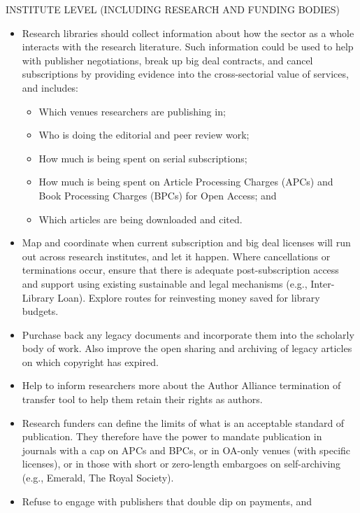 \documentclass[]{article}
\begin{document}
INSTITUTE LEVEL (INCLUDING RESEARCH AND FUNDING BODIES)

\begin{itemize}
\item
  Research libraries should collect information about how the sector as
  a whole interacts with the research literature. Such information could
  be used to help with publisher negotiations, break up big deal
  contracts, and cancel subscriptions by providing evidence into the
  cross-sectorial value of services, and includes:

  \begin{itemize}
  \item
    Which venues researchers are publishing in;
  \item
    Who is doing the editorial and peer review work;
  \item
    How much is being spent on serial subscriptions;
  \item
    How much is being spent on Article Processing Charges (APCs) and
    Book Processing Charges (BPCs) for Open Access; and
  \item
    Which articles are being downloaded and cited.
  \end{itemize}
\item
  Map and coordinate when current subscription and big deal licenses
  will run out across research institutes, and let it happen. Where
  cancellations or terminations occur, ensure that there is adequate
  post-subscription access and support using existing sustainable and
  legal mechanisms (e.g., Inter-Library Loan). Explore routes for
  reinvesting money saved for library budgets.
\item
  Purchase back any legacy documents and incorporate them into the
  scholarly body of work. Also improve the open sharing and archiving of
  legacy articles on which copyright has expired.
\item
  Help to inform researchers more about the Author Alliance termination
  of transfer tool to help them retain their rights as authors.
\item
  Research funders can define the limits of what is an acceptable
  standard of publication. They therefore have the power to mandate
  publication in journals with a cap on APCs and BPCs, or in OA-only
  venues (with specific licenses), or in those with short or zero-length
  embargoes on self-archiving (e.g., Emerald, The Royal Society).
\item
  Refuse to engage with publishers that double dip on payments, and

\end{itemize}
\end{document}
